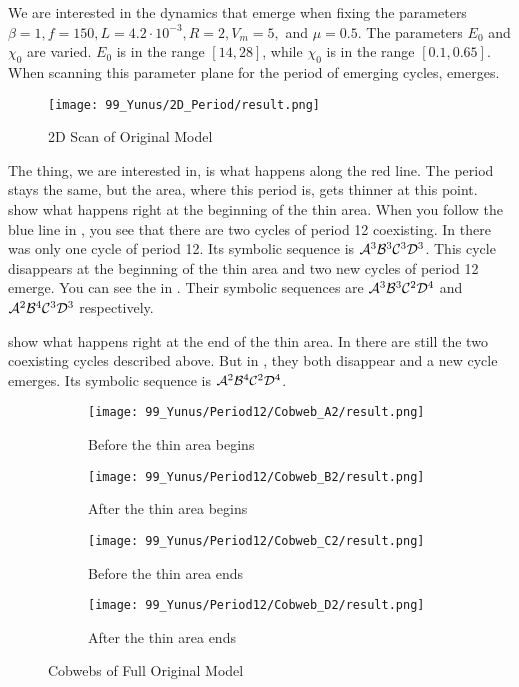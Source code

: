 We are interested in the dynamics that emerge when fixing the parameters $\beta = 1, f = 150, L = 4.2 \cdot 10^{-3}, R = 2, V_m = 5,$ and $\mu = 0.5$.
The parameters $E_0$ and $\chi_0$ are varied.
$E_0$ is in the range $[14, 28]$, while $\chi_0$ is in the range $[0.1, 0.65]$.
When scanning this parameter plane for the period of emerging cycles,  emerges.

\begin{figure}
    \centering
    \texttt{[image: 99\_Yunus/2D\_Period/result.png]}
    \caption{2D Scan of Original Model}
    \label{fig:yunus.2pi.2d.full}
\end{figure}

The thing, we are interested in, is what happens along the red line.
The period stays the same, but the area, where this period is, gets thinner at this point.
 show what happens right at the beginning of the thin area.
When you follow the blue line in , you see that there are two cycles of period 12 coexisting.
In  there was only one cycle of period 12.
Its symbolic sequence is $\mathcal{A}^3\mathcal{B}^3\mathcal{C}^3\mathcal{D}^3$.
This cycle disappears at the beginning of the thin area and two new cycles of period 12 emerge.
You can see the in .
Their symbolic sequences are $\mathcal{A}^3\mathcal{B}^3\mathcal{C}^2\mathcal{D}^4$ and $\mathcal{A}^2\mathcal{B}^4\mathcal{C}^3\mathcal{D}^3$ respectively.

 show what happens right at the end of the thin area.
In  there are still the two coexisting cycles described above.
But in , they both disappear and a new cycle emerges.
Its symbolic sequence is $\mathcal{A}^2\mathcal{B}^4\mathcal{C}^2\mathcal{D}^4$.

\begin{figure}
    \centering
    \begin{subfigure}{0.4\textwidth}
        \centering
        \texttt{[image: 99\_Yunus/Period12/Cobweb\_A2/result.png]}
        \caption{Before the thin area begins}
        \label{fig:yunus.2pi.CobwebA2}
    \end{subfigure}
    \begin{subfigure}{0.4\textwidth}
        \centering
        \texttt{[image: 99\_Yunus/Period12/Cobweb\_B2/result.png]}
        \caption{After the thin area begins}
        \label{fig:yunus.2pi.CobwebB2}
    \end{subfigure}
    \begin{subfigure}{0.4\textwidth}
        \centering
        \texttt{[image: 99\_Yunus/Period12/Cobweb\_C2/result.png]}
        \caption{Before the thin area ends}
        \label{fig:yunus.2pi.CobwebC2}
    \end{subfigure}
    \begin{subfigure}{0.4\textwidth}
        \centering
        \texttt{[image: 99\_Yunus/Period12/Cobweb\_D2/result.png]}
        \caption{After the thin area ends}
        \label{fig:yunus.2pi.CobwebD2}
    \end{subfigure}
    \caption{Cobwebs of Full Original Model}
\end{figure}
